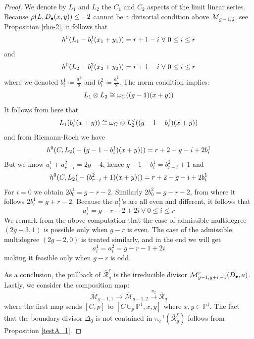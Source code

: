 \documentclass[10pt,a4paper]{amsart}
\def\cM{\mathcal{M}}
\def\mm{\overline{\mathcal{M}}}
\def\rr{\overline{\mathcal{R}}}
\begin{document}
\begin{proof}
	We denote by $L_1$ and $L_2$ the $C_1$ and $C_2$ aspects of the limit linear series. Because $\rho\text{\large(}L, D_\bullet(x,y)\text{\large)} \leq -2$ cannot be a divisorial condition above $\mathcal{M}_{g-1,2}$, see Proposition \ref{rho-2}, it follows that 
	\[ h^0\text{\large(}L_1- b^1_i(x_1+y_1) \text{\large)} = r+1-i \ \forall\ 0 \leq i\leq r \] 
	and
		\[ h^0\text{\large(}L_2- b^2_i(x_2+y_2) \text{\large)} = r+1-i \ \forall \ 0\leq i\leq r \] 
   where we denoted $b^1_i \coloneqq \frac{a^1_i}{2}$ and $b^2_i \coloneqq \frac{a^2_i}{2}$. The norm condition implies: 
   \[ L_1\otimes L_2 \cong \omega_C\text{\large(}(g-1)(x+y) \text{\large )} \]
   It follows from here that 
   \[ L_1\text{\large(}b^1_i(x+y)\text{\large)} \cong \omega_C\otimes L_2^\vee\text{\large (}(g-1-b^1_i)(x+y) \text{\large )} \]
   and from Riemann-Roch we have 
   \[ h^0\text{\Large(}C, L_2\text{\large(}-(g-1-b^1_i)(x+y)\text{\large)}\text{\Large)} = r+2-g-i+2b^1_i \]
   But we know $a^1_i + a^2_{r-i} = 2g-4$, hence $g-1-b^1_i = b^2_{r-i} + 1$ and 
   \[ h^0\text{\Large(}C, L_2\text{\large(}-(b^2_{r-i}+1)(x+y)\text{\large)}\text{\Large)} = r+2-g-i+2b^1_i \]
   For $i = 0$ we obtain $2b^1_0 = g-r-2$. Similarly $2b_0^2 = g-r-2$, from where it follows $2b^1_r = g+r-2$. Because the $a^1_i$'s are all even and different, it follows that 
   \[ a^1_i = g-r-2+2i \ \forall \ 0\leq i \leq r \]
   We remark from the above computation that the case of admissible multidegree $(2g-3,1)$ is possible only when $g-r$ is even. The case of the admissible multidegree $(2g-2,0)$ is treated similarly, and in the end we will get 
   \[ a^1_i = a^2_i = g-r-1 + 2i \]
   making it feasible only when $g-r$ is odd. 
   
   As a conclusion, the pullback of $\rr^r_g$ is the irreducible divisor $\cM^r_{g-1, g+r-1}\text{\large (}D_{\bullet}, \textbf{a}\text{\large )}$. Lastly, we consider the composition map: 
   \[ \mm_{g-1,1} \rightarrow \mm_{g-1,2} \xrightarrow{\pi_2} \rr_g \]
   where the first map sends $[C,p]$ to $[C\cup_p \mathbb{P}^1, x,y]$ where $x, y\in \mathbb{P}^1$. The fact that the boundary divisor $\Delta_0$ is not contained in $\pi_2^{-1}(\rr^r_g)$ follows from Proposition \ref{testA_1}.
\end{proof}
\end{document}
